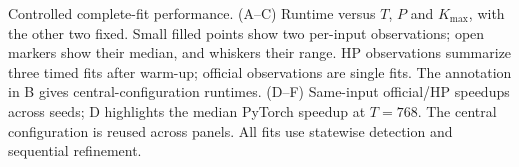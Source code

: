 Controlled complete-fit performance. (A--C) Runtime versus $T$, $P$ and $K_{\max}$, with the other two fixed. Small filled points show two per-input observations; open markers show their median, and whiskers their range. HP observations summarize three timed fits after warm-up; official observations are single fits. The annotation in B gives central-configuration runtimes. (D--F) Same-input official/HP speedups across seeds; D highlights the median PyTorch speedup at $T=768$. The central configuration is reused across panels. All fits use statewise detection and sequential refinement.
